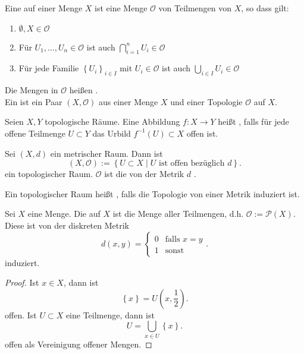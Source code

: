 \begin{definition}[Topologie]\label{def:topologie}
    Eine  auf einer Menge $X$ ist eine Menge  $\mathcal{O}$ von Teilmengen von  $X$, so dass gilt:
    \begin{enumerate}[1)]
        \item $\emptyset,X \in \mathcal{O}$
        \item Für $U_1,\ldots,U_n \in \mathcal{O}$ ist auch $\bigcap_{i=1}^n U_i \in  \mathcal{O}$
        \item Für jede Familie $\left \{U_i\right\} _{i\in I}$ mit $U_i \in \mathcal{O}$ ist auch $\bigcup_{i\in I} U_i \in  \mathcal{O}$
    \end{enumerate}
    Die Mengen in $\mathcal{O}$ heißen . \\
    Ein  ist ein Paar  $(X,\mathcal{O})$ aus einer Menge  $X$ und einer Topologie  $\mathcal{O}$ auf  $X$.
\end{definition}


\begin{definition}[Stetigkeit]\label{def:stetig}
    Seien $X,Y$ topologische Räume. Eine Abbildung  $f:X \to  Y$ heißt , falls für jede offene Teilmenge $U\subset Y$ das Urbild $f^{-1}(U) \subset X$ offen ist.
\end{definition}

\begin{example}
    Sei $(X,d)$ ein metrischer Raum. Dann ist
     \[
         (X, \mathcal{O}) := \left \{U\subset X \mid  U \text{ ist offen bezüglich $d$}\right\} 
    .\] 
    ein topologischer Raum. $\mathcal{O}$ ist die von der Metrik  $d$ .
\end{example}

\begin{definition}[Metrisierbarkeit]\label{def:metrisierbar}
    Ein topologischer Raum heißt , falls die Topologie von einer Metrik induziert ist.
\end{definition}

\begin{example}
    Sei $X$ eine Menge. Die  auf $X$ ist die Menge aller Teilmengen, d.h.  $\mathcal{O} := \mathcal{P}(X)$. Diese ist von der diskreten Metrik
    \[
        d(x,y) = \begin{cases}
            0 & \text{falls }x=y \\
            1 & \text{sonst}
        \end{cases}
    .\] 
    induziert.
\end{example}
\begin{proof}
    Ist $x\in X$, dann ist
    \[
        \left \{x\right\} =U\left(x,\frac{1}{2}\right)
    .\] 
    offen. Ist $U\subset X$ eine Teilmenge, dann ist
    \[
    U = \bigcup_{x\in U} \left \{x\right\}
    .\] 
    offen als Vereinigung offener Mengen.
\end{proof}

